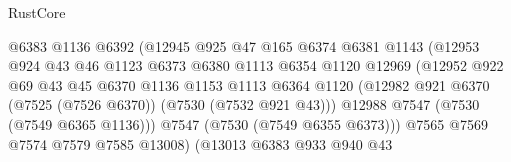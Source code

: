 \begin{lexlean}{RustCore}
\begin{coremodule}
                                      @6383
                                      @1136
                                      @6392
                                      (@12945
                                        @925
                                        @47
                                        @165
                                        @6374
                                        @6381
                                        @1143
                                        (@12953
                                          @924
                                          @43
                                          @46
                                          @1123
                                          @6373
                                          @6380
                                          @1113
                                          @6354
                                          @1120
                                          @12969
                                          (@12952
                                            @922
                                            @69
                                            @43
                                            @45
                                            @6370
                                            @1136
                                            @1153
                                            @1113
                                            @6364
                                            @1120
                                            (@12982
                                              @921
                                              @6370
                                              (@7525 (@7526 @6370))
                                              (@7530 (@7532 @921 @43)))
                                            @12988
                                            @7547
                                            (@7530 (@7549 @6365 @1136)))
                                          @7547
                                          (@7530 (@7549 @6355 @6373)))
                                        @7565
                                        @7569
                                        @7574
                                        @7579
                                        @7585
                                        @13008)
                                      (@13013
                                        @6383
                                        @933
                                        @940
                                        @43

\end{coremodule}
\end{lexlean}
